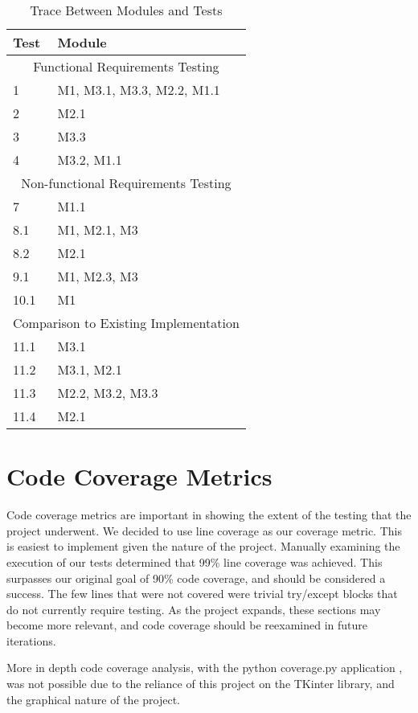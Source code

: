 \documentclass[12pt, titlepage]{article}
\begin{document}
\begin{table}[h!]
\centering
\begin{tabular}{p{} p{}}
\toprule
\textbf{Test} & \textbf{Module}\\
\midrule
\multicolumn{2}{c}{Functional Requirements Testing} \\
\midrule
1 & M1, M3.1, M3.3, M2.2, M1.1 \\
2 & M2.1 \\
3 & M3.3 \\
4 & M3.2, M1.1 \\
\midrule
\multicolumn{2}{c}{Non-functional Requirements Testing} \\
\midrule
7 & M1.1\\
8.1 & M1, M2.1, M3\\
8.2 & M2.1\\
9.1 &  M1, M2.3, M3\\
10.1 & M1\\
\midrule
\multicolumn{2}{c}{Comparison to Existing Implementation} \\
\midrule
11.1 & M3.1\\
11.2 & M3.1, M2.1\\
11.3 & M2.2, M3.2, M3.3 \\
11.4 & M2.1\\
\bottomrule
\end{tabular}
\caption{Trace Between Modules and Tests}
\end{table}
		

\section{Code Coverage Metrics}
Code coverage metrics are important in showing the extent of the testing that the project underwent. We decided to use line coverage as our coverage metric. This is easiest to implement given the nature of the project. Manually examining the execution of our tests determined that 99\% line coverage was achieved. This surpasses our original goal of 90\% code coverage, and should be considered a success. The few lines that were not covered were trivial try/except blocks that do not currently require testing. As the project expands, these sections may become more relevant, and code coverage should be reexamined in future iterations. 

More in depth code coverage analysis, with the python coverage.py application , was not possible due to the reliance of this project on the TKinter library, and the graphical nature of the project.


\end{document}
